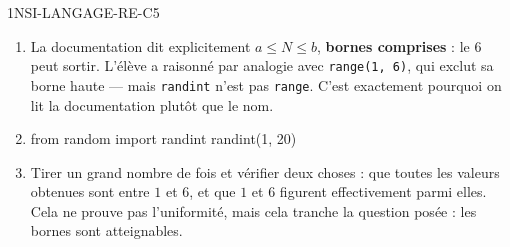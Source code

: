 \begin{corrige}{1NSI-LANGAGE-RE-C5}
\begin{enumerate}
  \item La documentation dit explicitement $a \leq N \leq b$, \textbf{bornes comprises} : le
        $6$ peut sortir. L'élève a raisonné par analogie avec \lstinline{range(1, 6)}, qui
        exclut sa borne haute — mais \lstinline{randint} n'est pas \lstinline{range}. C'est
        exactement pourquoi on lit la documentation plutôt que le nom.
  \item \begin{python}
from random import randint
randint(1, 20)
        \end{python}
  \item Tirer un grand nombre de fois et vérifier deux choses : que toutes les valeurs
        obtenues sont entre $1$ et $6$, et que $1$ et $6$ figurent effectivement parmi elles.
        Cela ne prouve pas l'uniformité, mais cela tranche la question posée : les bornes sont
        atteignables.
\end{enumerate}
\end{corrige}
